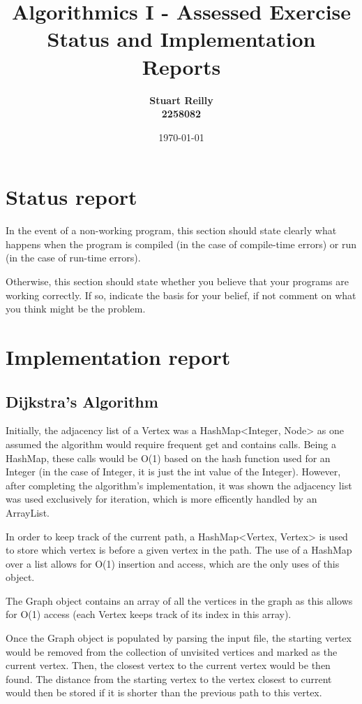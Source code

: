 \documentclass{article}
\title{Algorithmics I - Assessed Exercise\\ \vspace{4mm} 
Status and Implementation Reports}
\author{\bf Stuart Reilly\\ \bf 2258082}
\date{\today}
\begin{document}
\maketitle

\section*{Status report}

In the event of a non-working program, this section should state clearly what happens when the program is compiled (in the case of compile-time errors) or run (in the case of run-time errors).  

Otherwise, this section should state whether you believe that your programs are working correctly. If so, indicate the basis for your belief, if not comment on what you think might be the problem.

\section*{Implementation report}

\subsection*{Dijkstra's Algorithm}

Initially, the adjacency list of a Vertex was a HashMap<Integer, Node> as one assumed the algorithm would require frequent get and contains calls.
Being a HashMap, these calls would be O(1) based on the hash function used for an Integer (in the case of Integer, it is just the int value of the Integer).
However, after completing the algorithm's implementation, it was shown the adjacency list was used exclusively for iteration, which is more efficently handled by an ArrayList.

In order to keep track of the current path, a HashMap<Vertex, Vertex> is used to store which vertex is before a given vertex in the path.
The use of a HashMap over a list allows for O(1) insertion and access, which are the only uses of this object.

The Graph object contains an array of all the vertices in the graph as this allows for O(1) access (each Vertex keeps track of its index in this array).

Once the Graph object is populated by parsing the input file, the starting vertex would be removed from the collection of unvisited vertices and marked as the current vertex.
Then, the closest vertex to the current vertex would be then found.
The distance from the starting vertex to the vertex closest to current would then be stored if it is shorter than the previous path to this vertex.
\end{document}
